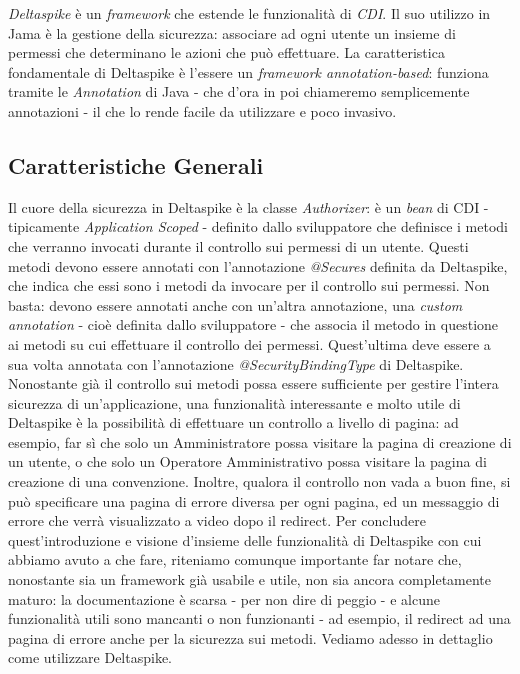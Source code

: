 \textsl{Deltaspike} è un \textit{framework} che estende le funzionalità di \textsl{CDI}. Il suo utilizzo in Jama è la gestione della sicurezza: associare ad ogni utente un insieme di permessi che determinano le azioni che può effettuare.
La caratteristica fondamentale di Deltaspike è l'essere un \textit{framework annotation-based}: funziona tramite le \textsl{Annotation} di Java - che d'ora in poi chiameremo semplicemente annotazioni - il che lo rende facile da utilizzare e poco invasivo.

\subsection{Caratteristiche Generali}
Il cuore della sicurezza in Deltaspike è la classe \textsl{Authorizer}: è un \textit{bean} di CDI - tipicamente \textsl{Application Scoped} - definito dallo sviluppatore che definisce i metodi che verranno invocati durante il controllo sui permessi di un utente. Questi metodi devono essere annotati con l'annotazione \textsl{@Secures} definita da Deltaspike, che indica che essi sono i metodi da invocare per il controllo sui permessi. Non basta: devono essere annotati anche con un'altra annotazione, una \textsl{custom annotation} - cioè definita dallo sviluppatore - che associa il metodo in questione ai metodi su cui effettuare il controllo dei permessi. Quest'ultima deve essere a sua volta annotata con l'annotazione \textsl{@SecurityBindingType} di Deltaspike.\newline
Nonostante già il controllo sui metodi possa essere sufficiente per gestire l'intera sicurezza di un'applicazione, una funzionalità interessante e molto utile di Deltaspike è la possibilità di effettuare un controllo a livello di pagina: ad esempio, far sì che solo un Amministratore possa visitare la pagina di creazione di un utente, o che solo un Operatore Amministrativo possa visitare la pagina di creazione di una convenzione. Inoltre, qualora il controllo non vada a buon fine, si può specificare una pagina di errore diversa per ogni pagina, ed un messaggio di errore che verrà visualizzato a video dopo il redirect.\newline
Per concludere quest'introduzione e visione d'insieme delle funzionalità di Deltaspike con cui abbiamo avuto a che fare, riteniamo comunque importante far notare che, nonostante sia un framework già usabile e utile, non sia ancora completamente maturo: la documentazione è scarsa - per non dire di peggio - e alcune funzionalità utili sono mancanti o non funzionanti - ad esempio, il redirect ad una pagina di errore anche per la sicurezza sui metodi.\newline
Vediamo adesso in dettaglio come utilizzare Deltaspike.



